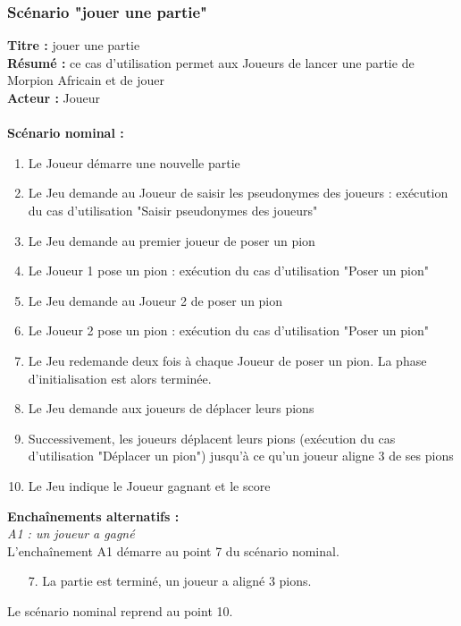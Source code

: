 \documentclass[12pt , a4paper]{article}
\begin{document}
\subsubsection{Scénario "jouer une partie"}
\noindent\textbf{Titre : } jouer une partie\\
\textbf{Résumé : } ce cas d'utilisation permet aux Joueurs de lancer une partie de Morpion Africain et de jouer\\
\textbf{Acteur : }Joueur\\ \\
\textbf{Scénario nominal :}
\begin{enumerate}
\item Le Joueur démarre une nouvelle partie
\item Le Jeu demande au Joueur de saisir les pseudonymes des joueurs : exécution du cas d'utilisation "Saisir pseudonymes des joueurs"
\item Le Jeu demande au premier joueur de poser un pion
\item Le Joueur 1 pose un pion : exécution du cas d'utilisation "Poser un pion"
\item Le Jeu demande au Joueur 2 de poser un pion
\item Le Joueur 2 pose un pion : exécution du cas d'utilisation "Poser un pion"
\item Le Jeu redemande deux fois à chaque Joueur de poser un pion. La phase d'initialisation est alors terminée.
\item Le Jeu demande aux joueurs de déplacer leurs pions
\item Successivement, les joueurs déplacent leurs pions (exécution du cas d'utilisation "Déplacer un pion") jusqu'à ce qu'un joueur aligne 3 de ses pions
\item Le Jeu indique le Joueur gagnant et le score
\end{enumerate}
\textbf{Encha\^inements alternatifs :}\\
\textit{A1 : un joueur a gagné}\\
L'encha\^inement A1 démarre au point 7 du scénario nominal.
\begin{enumerate}
\item[7.] La partie est terminé, un joueur a aligné 3 pions.
\end{enumerate}
Le scénario nominal reprend au point 10.\\
\end{document}
